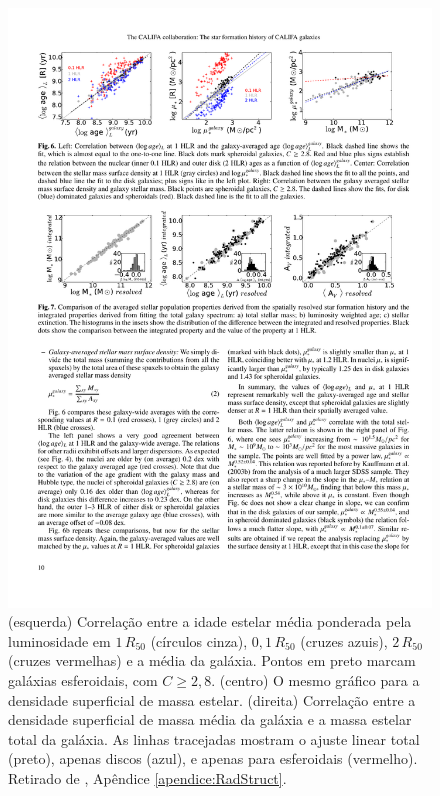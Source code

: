 \begin{figure}
	\includegraphics[width=1.0\columnwidth]{figuras/radstruct-01}
	\caption[Correlação entre idade, desidade superficial e massa estelar total]
	{(esquerda) Correlação entre a idade estelar média ponderada pela luminosidade
	em $1\,R_{50}$ (círculos cinza), $0,1\,R_{50}$ (cruzes azuis), $2\,R_{50}$
	(cruzes vermelhas) e a média da galáxia. Pontos em preto marcam galáxias
	esferoidais, com $C \geq 2,8$. (centro) O mesmo gráfico para a densidade
	superficial de massa estelar. (direita) Correlação entre a densidade
	superficial de massa média da galáxia e a massa estelar total da galáxia. As
	linhas tracejadas mostram o ajuste linear total (preto), apenas discos (azul),
	e apenas para esferoidais (vermelho).  Retirado de \cite[figura
	6]{GonzalezDelgado2013}, Apêndice \ref{apendice:RadStruct}.}
	\label{fig:radStruct1}
\end{figure}

